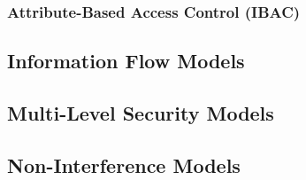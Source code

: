 \subsubsection{Attribute-Based Access Control (IBAC)}

\subsection{Information Flow Models}

\subsection{Multi-Level Security Models}

\subsection{Non-Interference Models}
